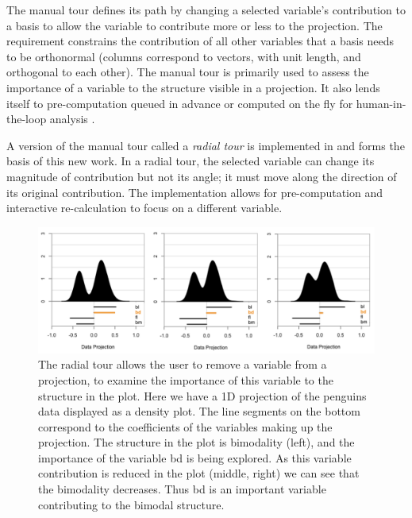 \documentclass[
]{jss}
\begin{document}
The manual tour \citep{cook_manual_1997} defines its path by changing a
selected variable's contribution to a basis to allow the variable to
contribute more or less to the projection. The requirement constrains
the contribution of all other variables that a basis needs to be
orthonormal (columns correspond to vectors, with unit length, and
orthogonal to each other). The manual tour is primarily used to assess
the importance of a variable to the structure visible in a projection.
It also lends itself to pre-computation queued in advance or computed on
the fly for human-in-the-loop analysis
\citep{karwowski_international_2006}.

A version of the manual tour called a \emph{radial tour} is implemented
in \citet{spyrison_spinifex_2020} and forms the basis of this new work.
In a radial tour, the selected variable can change its magnitude of
contribution but not its angle; it must move along the direction of its
original contribution. The implementation allows for pre-computation and
interactive re-calculation to focus on a different variable.

\begin{CodeChunk}
\begin{figure}

{\centering \includegraphics[width=0.99\linewidth]{./figures/radial_tour} 

}

\caption{The radial tour allows the user to remove a variable from a projection, to examine the importance of this variable to the structure in the plot. Here we have a 1D projection of the penguins data displayed as a density plot. The line segments on the bottom correspond to the coefficients of the variables making up the projection. The structure in the plot is bimodality (left), and the importance of the variable \textsf{bd} is being explored. As this variable contribution is reduced in the plot (middle, right) we can see that the bimodality decreases. Thus \textsf{bd} is an important variable contributing to the bimodal structure.}\label{fig:radialtour}
\end{figure}
\end{CodeChunk}
\end{document}
